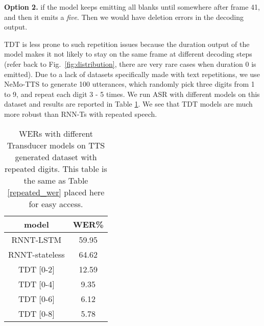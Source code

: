 \documentclass{article}
\begin{document}
\textbf{Option 2.} if the model keeps emitting all blanks until somewhere after frame 41, and then it  emits a \emph{five}. Then we would have deletion errors in the decoding output.


TDT is less prone to such repetition issues because the duration output of the model makes it not likely to stay on the same frame at different decoding steps (refer back to Fig.~\ref{fig:distribution}, there are very rare cases when duration 0 is emitted). Due to a lack of datasets specifically made with text repetitions, we use NeMo-TTS to generate 100 utterances, which randomly pick three digits from 1 to 9, and repeat each digit 3 - 5 times. We run ASR with different models on this dataset and results are  reported in Table \ref{repeated_wer2}. We see that TDT models are much more robust than RNN-Ts with repeated speech.

\begin{table}[h!]
    \centering
    \begin{tabular}{c c}
    \toprule
        model & WER\%\\
    \midrule
        RNNT-LSTM & 59.95 \\
        RNNT-stateless & 64.62 \\
        TDT [0-2] & 12.59 \\
        TDT [0-4] & 9.35 \\
        TDT [0-6] & 6.12 \\
        TDT [0-8] & 5.78 \\
    \bottomrule
    \end{tabular}
    \caption{WERs with different Transducer models on TTS generated dataset with repeated digits. This table is the same as Table \ref{repeated_wer} placed here for easy access.}
    \label{repeated_wer2}
\end{table}
\end{document}
